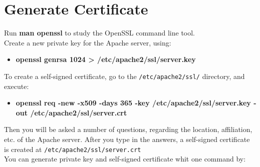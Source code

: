 \documentclass[10pt,a4paper]{article}
\numberwithin{equation}{section}
\numberwithin{figure}{section}
\numberwithin{table}{section}
\begin{document}
\section{Generate Certificate}
	Run \textbf{man openssl} to study the OpenSSL command line tool.\\
	Create a new private key for the Apache server, using:
	\begin{itemize}
		\item \textbf{openssl genrsa 1024 > /etc/apache2/ssl/server.key}
	\end{itemize}
	To create a self-signed certificate, go to the \texttt{/etc/apache2/ssl/} directory, and execute:
	\begin{itemize}
		\item \textbf{openssl req -new -x509 -days 365 -key /etc/apache2/ssl/server.key -out /etc/apache2/ssl/server.crt}
	\end{itemize}
	Then you will be asked a number of questions, regarding the location, affiliation, etc. of the Apache server. After you type in the answers, a self-signed certificate is created at \texttt{/etc/apache2/ssl/server.crt}\\
	You can generate private key and self-signed certificate whit one command by:
\end{document}
